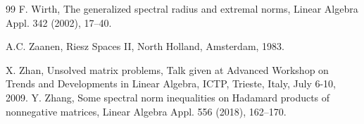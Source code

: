\documentclass[12pt, reqno]{amsart}
\theoremstyle{definition}
\theoremstyle{remark}
\numberwithin{equation}{section}
\begin{document}
\begin{thebibliography}{99}
 F. Wirth, The generalized spectral radius and extremal norms,  Linear Algebra
         Appl. 342 (2002), 17--40.

 A.C. Zaanen,
 Riesz Spaces II, North Holland, Amsterdam, 1983.

 X. Zhan,  Unsolved matrix problems, Talk given at  Advanced Workshop on Trends and Developments in Linear Algebra, ICTP, Trieste, Italy,
July 6-10, 2009.
 Y. Zhang, Some spectral norm inequalities on Hadamard products of nonnegative matrices, Linear Algebra  Appl. 556 (2018), 162--170.



\end{thebibliography}
\end{document}
